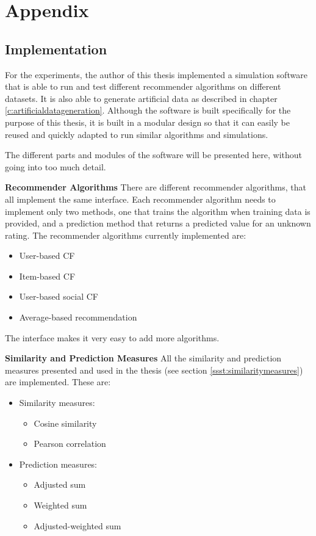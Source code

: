 \chapter{Appendix}
\label{a:appendix}

\section{Implementation}
\label{st:implementation} For the experiments, the author of this thesis implemented a simulation software that is able to run and test different recommender algorithms on different datasets. It is also able to generate artificial data as described in chapter \ref{c:artificialdatageneration}. Although the software is built specifically for the purpose of this thesis, it is built in a modular design so that it can easily be reused and quickly adapted to run similar algorithms and simulations.
\newline

The different parts and modules of the software will be presented here, without going into too much detail.
\newline

\textbf{Recommender Algorithms} There are different recommender algorithms, that all implement the same interface. Each recommender algorithm needs to implement only two methods, one that trains the algorithm when training data is provided, and a prediction method that returns a predicted value for an unknown rating. The recommender algorithms currently implemented are:

\begin{itemize}
\item User-based CF
\item Item-based CF
\item User-based social CF
\item Average-based recommendation
\end{itemize}

The interface makes it very easy to add more algorithms.
\newline

\textbf{Similarity and Prediction Measures} All the similarity and prediction measures presented and used in the thesis (see section \ref{ssst:similaritymeasures}) are implemented. These are:

\begin{itemize}
\item Similarity measures:
\begin{itemize}
\item Cosine similarity
\item Pearson correlation
\end{itemize}
\item Prediction measures:
\begin{itemize}
\item Adjusted sum
\item Weighted sum
\item Adjusted-weighted sum
\end{itemize}
\end{itemize}

